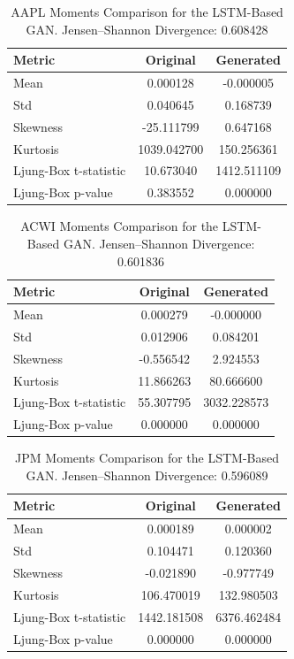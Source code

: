 \documentclass{article}
\begin{document}
\begin{table}[h!]
\centering
\begin{tabular}{lcc}
\hline
\textbf{Metric} & \textbf{Original} & \textbf{Generated} \\
\hline
Mean     & 0.000128 & -0.000005 \\
Std      & 0.040645 & 0.168739 \\
Skewness & -25.111799 & 0.647168 \\
Kurtosis & 1039.042700 & 150.256361 \\
Ljung-Box t-statistic & 10.673040 & 1412.511109 \\
Ljung-Box p-value & 0.383552 & 0.000000 \\
\hline
\end{tabular}
\caption{AAPL Moments Comparison for the LSTM-Based GAN.
Jensen--Shannon Divergence: 0.608428}
\label{tab:aapl_attention}
\end{table}

\begin{table}[h!]
\centering
\begin{tabular}{lcc}
\hline
\textbf{Metric} & \textbf{Original} & \textbf{Generated} \\
\hline
Mean     & 0.000279 & -0.000000 \\
Std      & 0.012906 & 0.084201 \\
Skewness & -0.556542 & 2.924553 \\
Kurtosis & 11.866263 & 80.666600 \\
Ljung-Box t-statistic & 55.307795 & 3032.228573 \\
Ljung-Box p-value & 0.000000 & 0.000000 \\
\hline
\end{tabular}
\caption{ACWI Moments Comparison for the LSTM-Based GAN.
Jensen--Shannon Divergence: 0.601836}
\label{tab:acwi_lstm}
\end{table}

\begin{table}[h!]
\centering
\begin{tabular}{lcc}
\hline
\textbf{Metric} & \textbf{Original} & \textbf{Generated} \\
\hline
Mean     & 0.000189 & 0.000002 \\
Std      & 0.104471 & 0.120360 \\
Skewness & -0.021890 & -0.977749 \\
Kurtosis & 106.470019 & 132.980503 \\
Ljung-Box t-statistic & 1442.181508 & 6376.462484 \\
Ljung-Box p-value & 0.000000 & 0.000000 \\
\hline
\end{tabular}
\caption{JPM Moments Comparison for the LSTM-Based GAN.
Jensen--Shannon Divergence: 0.596089}
\label{tab:jpm_lstm}
\end{table}
\end{document}
